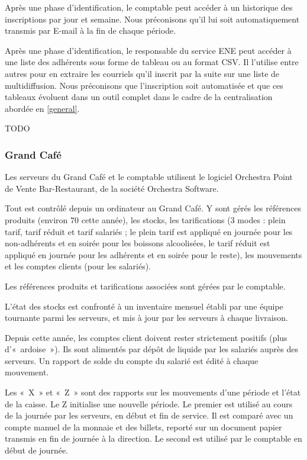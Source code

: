 Après une phase d'identification, le comptable peut accéder à un historique des inscriptions
par jour et semaine. Nous préconisons qu'il lui soit automatiquement transmis par E-mail
à la fin de chaque période.

Après une phase d'identification, le responsable du service ENE peut accéder à une liste
des adhérents sous forme de tableau ou au format CSV. Il l'utilise entre autres pour en
extraire les courriels qu'il inscrit par la suite sur une liste de multidiffusion.
Nous préconisons que l'inscription soit automatisée
et que ces tableaux évoluent dans un outil complet
dans le cadre de la centralisation abordée en \ref{general}.

TODO

\subsubsection{Grand Café}

Les serveurs du Grand Café et le comptable utilisent le logiciel Orchestra
Point de Vente Bar-Restaurant, de la société Orchestra Software.

Tout est contrôlé depuis un ordinateur au Grand Café. Y sont gérés les
références produits (environ 70 cette année), les stocks, les tarifications
(3 modes : plein tarif, tarif réduit et tarif salariés ; le plein tarif
est appliqué en journée pour les non-adhérents et en soirée pour les boissons
alcoolisées, le tarif réduit est appliqué en journée pour les adhérents
et en soirée pour le reste), les mouvements et les comptes clients (pour les
salariés).

Les références produits et tarifications associées sont gérées par le comptable.

L'état des stocks est confronté à un inventaire mensuel établi par une équipe
tournante parmi les serveurs, et mis à jour par les serveurs à chaque
livraison.

Depuis cette année, les comptes client doivent rester strictement positifs
(plus d'«~ardoise~»).
Ils sont alimentés par dépôt de liquide par les salariés auprès des serveurs.
Un rapport de solde du compte du salarié est édité à chaque mouvement.

Les «~X~» et «~Z~» sont des rapports sur les mouvements d'une période et
l'état de la caisse. Le Z initialise une nouvelle période.
Le premier est utilisé au cours de la journée par les serveurs, en début et fin
de service. Il est comparé avec un compte manuel de la monnaie et des billets,
reporté sur un document papier transmis en fin de journée à la direction.
Le second est utilisé par le comptable en début de journée.

